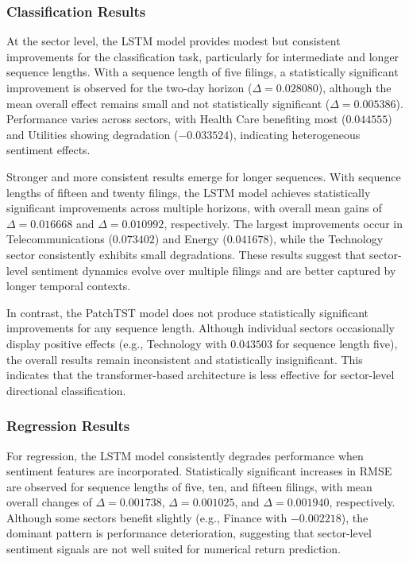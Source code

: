 \subsubsection{Classification Results}

At the sector level, the LSTM model provides modest but consistent improvements for the classification task, particularly for intermediate and longer sequence lengths. With a sequence length of five filings, a statistically significant improvement is observed for the two-day horizon ($\Delta = 0.028080$), although the mean overall effect remains small and not statistically significant ($\Delta = 0.005386$). Performance varies across sectors, with Health Care benefiting most ($0.044555$) and Utilities showing degradation ($-0.033524$), indicating heterogeneous sentiment effects.

Stronger and more consistent results emerge for longer sequences. With sequence lengths of fifteen and twenty filings, the LSTM model achieves statistically significant improvements across multiple horizons, with overall mean gains of $\Delta = 0.016668$ and $\Delta = 0.010992$, respectively. The largest improvements occur in Telecommunications ($0.073402$) and Energy ($0.041678$), while the Technology sector consistently exhibits small degradations. These results suggest that sector-level sentiment dynamics evolve over multiple filings and are better captured by longer temporal contexts.

In contrast, the PatchTST model does not produce statistically significant improvements for any sequence length. Although individual sectors occasionally display positive effects (e.g., Technology with $0.043503$ for sequence length five), the overall results remain inconsistent and statistically insignificant. This indicates that the transformer-based architecture is less effective for sector-level directional classification.

\subsubsection{Regression Results}

For regression, the LSTM model consistently degrades performance when sentiment features are incorporated. Statistically significant increases in RMSE are observed for sequence lengths of five, ten, and fifteen filings, with mean overall changes of $\Delta = 0.001738$, $\Delta = 0.001025$, and $\Delta = 0.001940$, respectively. Although some sectors benefit slightly (e.g., Finance with $-0.002218$), the dominant pattern is performance deterioration, suggesting that sector-level sentiment signals are not well suited for numerical return prediction.

